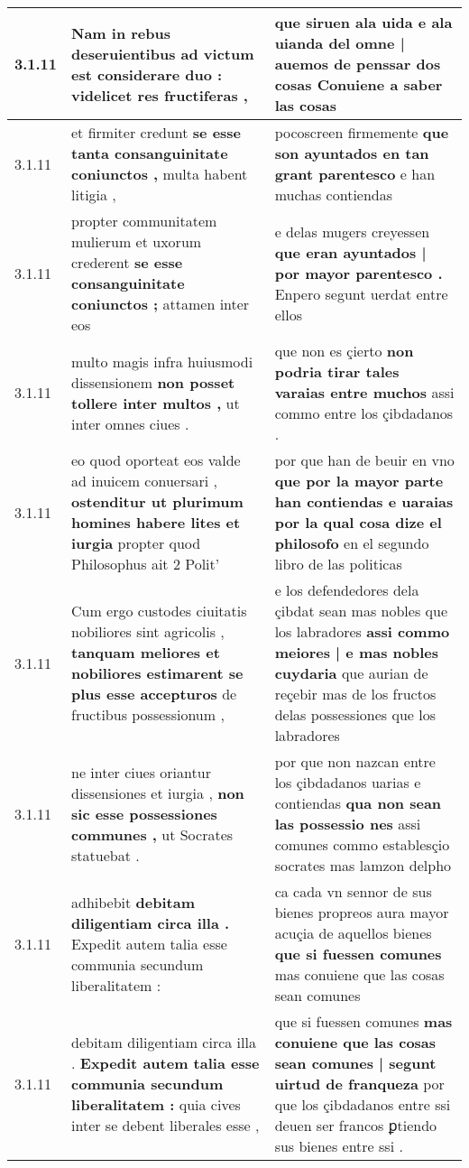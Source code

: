 \begin{tabular}{|p{1cm}|p{6.5cm}|p{6.5cm}|}
3.1.11 & Nam in rebus deseruientibus \textbf{ ad victum est considerare duo : } videlicet res fructiferas , & que siruen ala uida \textbf{ e ala uianda del omne | auemos de penssar dos cosas } Conuiene a saber las cosas \\\hline
3.1.11 & et firmiter credunt \textbf{ se esse tanta consanguinitate coniunctos , } multa habent litigia , & pocoscreen firmemente \textbf{ que son ayuntados en tan grant parentesco } e han muchas contiendas \\\hline
3.1.11 & propter communitatem mulierum et uxorum crederent \textbf{ se esse consanguinitate coniunctos ; } attamen inter eos & e delas mugers creyessen \textbf{ que eran ayuntados | por mayor parentesco . } Enpero segunt uerdat entre ellos \\\hline
3.1.11 & multo magis infra huiusmodi dissensionem \textbf{ non posset tollere inter multos , } ut inter omnes ciues . & que non es çierto \textbf{ non podria tirar tales varaias entre muchos } assi commo entre los çibdadanos . \\\hline
3.1.11 & eo quod oporteat eos valde ad inuicem conuersari , \textbf{ ostenditur ut plurimum homines habere lites et iurgia } propter quod Philosophus ait 2 Polit’ & por que han de beuir en vno \textbf{ que por la mayor parte han contiendas e uaraias por la qual cosa dize el philosofo } en el segundo libro de las politicas \\\hline
3.1.11 & Cum ergo custodes ciuitatis nobiliores sint agricolis , \textbf{ tanquam meliores et nobiliores estimarent se plus esse accepturos } de fructibus possessionum , & e los defendedores dela çibdat sean mas nobles que los labradores \textbf{ assi commo meiores | e mas nobles cuydaria } que aurian de reçebir mas de los fructos delas possessiones que los labradores \\\hline
3.1.11 & ne inter ciues oriantur dissensiones et iurgia , \textbf{ non sic esse possessiones communes , } ut Socrates statuebat . & por que non nazcan entre los çibdadanos uarias e contiendas \textbf{ qua non sean las possessio nes } assi comunes commo establesçio socrates mas lamzon delpho \\\hline
3.1.11 & adhibebit \textbf{ debitam diligentiam circa illa . } Expedit autem talia esse communia secundum liberalitatem : & ca cada vn sennor de sus bienes propreos aura mayor acuçia de aquellos bienes \textbf{ que si fuessen comunes } mas conuiene que las cosas sean comunes \\\hline
3.1.11 & debitam diligentiam circa illa . \textbf{ Expedit autem talia esse communia secundum liberalitatem : } quia cives inter se debent liberales esse , & que si fuessen comunes \textbf{ mas conuiene que las cosas sean comunes | segunt uirtud de franqueza } por que los çibdadanos entre ssi deuen ser francos ꝑtiendo sus bienes entre ssi . \\\hline

\end{tabular}

